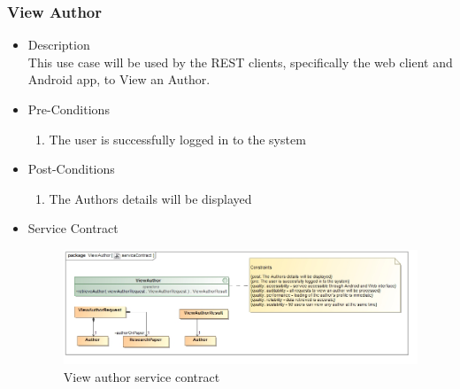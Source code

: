 \documentclass[a4paper,10pt]{article}
\begin{document}
\subsubsection{View Author}
	\begin{itemize}
		\item Description\\
			This use case will be used by the REST clients, specifically the web client and Android app, to View an Author.
		\item Pre-Conditions
			\begin{enumerate}
				\item The user is successfully logged in to the system
			\end{enumerate}
		\item Post-Conditions
			\begin{enumerate}
				\item The Authors details will be displayed
						
			\end{enumerate}
		\item Service Contract
		\begin{figure}[H]
			\includegraphics[scale=0.5]{ViewAuthorServiceContract}
			\caption{View author service contract}
		\end{figure}
	\end{itemize}
	
\end{document}
